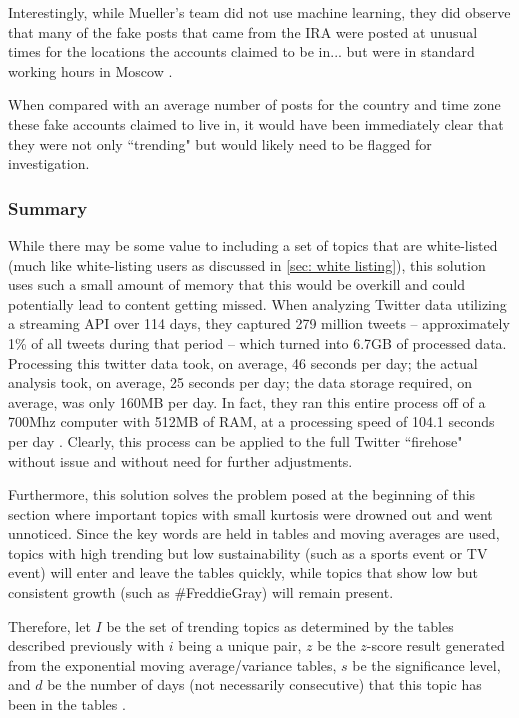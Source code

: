 \documentclass[preprint,review,12pt]{elsarticle}
\begin{document}
Interestingly, while Mueller's team did not use machine learning, they did observe that many of the fake posts that came from the IRA were posted at unusual times for the locations the accounts claimed to be in... but were in standard working hours in Moscow \cite{mueller2020internet}.

When compared with an average number of posts for the country and time zone these fake accounts claimed to live in, it would have been immediately clear that they were not only ``trending" but would likely need to be flagged for investigation.

\subsubsection{Summary}
\label{what is being shared summary}
While there may be some value to including a set of topics that are white-listed (much like white-listing users as discussed in \ref{sec: white listing}), this solution uses such a small amount of memory that this would be overkill and could potentially lead to content getting missed. When analyzing Twitter data utilizing a streaming API over 114 days, they captured 279 million tweets -- approximately 1\% of all tweets during that period -- which turned into 6.7GB of processed data. Processing this twitter data took, on average, 46 seconds per day; the actual analysis took, on average, 25 seconds per day; the data storage required, on average, was only 160MB per day. In fact, they ran this entire process off of a 700Mhz computer with 512MB of RAM, at a processing speed of 104.1 seconds per day \cite{schubert2014signitrend}. Clearly, this process can be applied to the full Twitter ``firehose" without issue and without need for further adjustments.

Furthermore, this solution solves the problem posed at the beginning of this section where important topics with small kurtosis were drowned out and went unnoticed. Since the key words are held in tables and moving averages are used, topics with high trending but low sustainability (such as a sports event or TV event) will enter and leave the tables quickly, while topics that show low but consistent growth (such as \#FreddieGray) will remain present. 

Therefore, let $I$ be the set of trending topics as determined by the tables described previously with $i$ being a unique pair, $z$ be the $z$-score result generated from the exponential moving average/variance tables, $s$ be the significance level, and $d$ be the number of days (not necessarily consecutive) that this topic has been in the tables .
\end{document}
